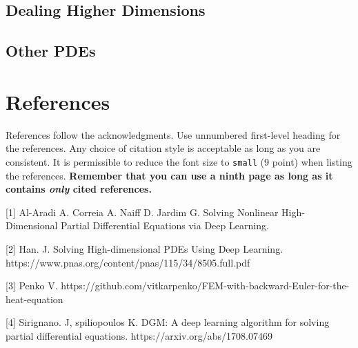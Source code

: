\documentclass{article}
\begin{document}
\subsection{Dealing Higher Dimensions}

\subsection{Other PDEs}

\section*{References}

References follow the acknowledgments. Use unnumbered first-level
heading for the references. Any choice of citation style is acceptable
as long as you are consistent. It is permissible to reduce the font
size to \verb+small+ (9 point) when listing the references. {\bf
  Remember that you can use a ninth page as long as it contains
  \emph{only} cited references.}
\medskip

\small

[1] Al-Aradi A. Correia A. Naiff D. Jardim G. Solving Nonlinear High-Dimensional Partial Differential Equations via Deep Learning.

[2] Han. J. Solving High-dimensional PDEs Using Deep Learning. https://www.pnas.org/content/pnas/115/34/8505.full.pdf

[3] Penko V. https://github.com/vitkarpenko/FEM-with-backward-Euler-for-the-heat-equation

[4] Sirignano. J, spiliopoulos K. DGM: A deep learning algorithm for solving partial differential equations. https://arxiv.org/abs/1708.07469
\end{document}
